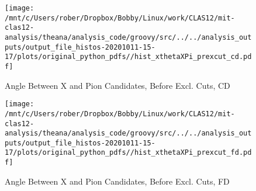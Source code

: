 \documentclass{article}
\begin{document}
\begin{landscape}
    \begin{figure}[h]
        \centering

        \texttt{[image: /mnt/c/Users/rober/Dropbox/Bobby/Linux/work/CLAS12/mit-clas12-analysis/theana/analysis\_code/groovy/src/../../analysis\_outputs/output\_file\_histos-20201011-15-17/plots/original\_python\_pdfs//hist\_xthetaXPi\_prexcut\_cd.pdf]}
        \captionsetup{textformat=empty,labelformat=blank}
        \caption{Angle Between X and Pion Candidates, Before Excl. Cuts, CD}
    \end{figure}
    \clearpage
    
    \begin{figure}[h]
        \centering

        \texttt{[image: /mnt/c/Users/rober/Dropbox/Bobby/Linux/work/CLAS12/mit-clas12-analysis/theana/analysis\_code/groovy/src/../../analysis\_outputs/output\_file\_histos-20201011-15-17/plots/original\_python\_pdfs//hist\_xthetaXPi\_prexcut\_fd.pdf]}
        \captionsetup{textformat=empty,labelformat=blank}
        \caption{Angle Between X and Pion Candidates, Before Excl. Cuts, FD}
    \end{figure}
    \clearpage
    
	\end{landscape}
	
\end{document}
